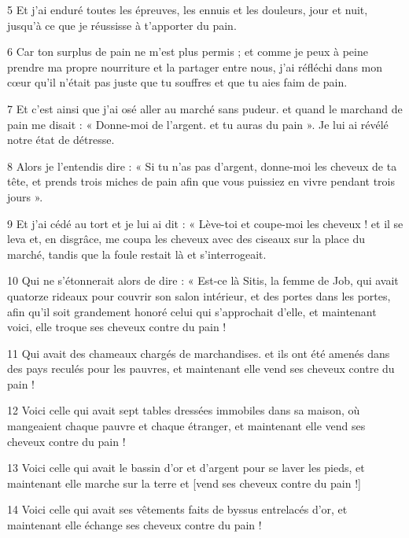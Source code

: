 \par 5 Et j'ai enduré toutes les épreuves, les ennuis et les douleurs, jour et nuit, jusqu'à ce que je réussisse à t'apporter du pain.

\par 6 Car ton surplus de pain ne m'est plus permis ; et comme je peux à peine prendre ma propre nourriture et la partager entre nous, j'ai réfléchi dans mon cœur qu'il n'était pas juste que tu souffres et que tu aies faim de pain.

\par 7 Et c'est ainsi que j'ai osé aller au marché sans pudeur. et quand le marchand de pain me disait : « Donne-moi de l'argent. et tu auras du pain ». Je lui ai révélé notre état de détresse.

\par 8 Alors je l'entendis dire : « Si tu n'as pas d'argent, donne-moi les cheveux de ta tête, et prends trois miches de pain afin que vous puissiez en vivre pendant trois jours ».

\par 9 Et j'ai cédé au tort et je lui ai dit : « Lève-toi et coupe-moi les cheveux ! et il se leva et, en disgrâce, me coupa les cheveux avec des ciseaux sur la place du marché, tandis que la foule restait là et s'interrogeait.

\par 10 Qui ne s'étonnerait alors de dire : « Est-ce là Sitis, la femme de Job, qui avait quatorze rideaux pour couvrir son salon intérieur, et des portes dans les portes, afin qu'il soit grandement honoré celui qui s'approchait d'elle, et maintenant voici, elle troque ses cheveux contre du pain !

\par 11 Qui avait des chameaux chargés de marchandises. et ils ont été amenés dans des pays reculés pour les pauvres, et maintenant elle vend ses cheveux contre du pain !

\par 12 Voici celle qui avait sept tables dressées immobiles dans sa maison, où mangeaient chaque pauvre et chaque étranger, et maintenant elle vend ses cheveux contre du pain !

\par 13 Voici celle qui avait le bassin d'or et d'argent pour se laver les pieds, et maintenant elle marche sur la terre et [vend ses cheveux contre du pain !]

\par 14 Voici celle qui avait ses vêtements faits de byssus entrelacés d'or, et maintenant elle échange ses cheveux contre du pain !

